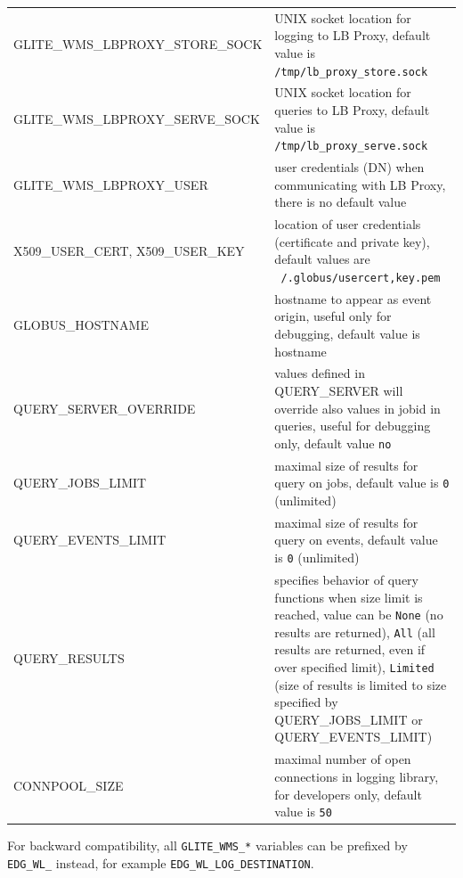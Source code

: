 \begin{tabularx}{\textwidth}{l>{\raggedright\arraybackslash}X}
GLITE\_WMS\_LBPROXY\_STORE\_SOCK &
   UNIX socket location for logging to LB Proxy,
   default value is \texttt{/tmp/lb\_proxy\_store.sock} \\
GLITE\_WMS\_LBPROXY\_SERVE\_SOCK &
   UNIX socket location for queries to LB Proxy,
   default value is \texttt{/tmp/lb\_proxy\_serve.sock} \\
GLITE\_WMS\_LBPROXY\_USER &
   user credentials (DN) when communicating with LB Proxy,  
   there is no default value \\
X509\_USER\_CERT, X509\_USER\_KEY & 
   location of user credentials (certificate and private key),
   default values are \texttt{~/.globus/user{cert,key}.pem} \\
GLOBUS\_HOSTNAME & 
   hostname to appear as event origin, useful only for debugging, 
   default value is hostname \\
QUERY\_SERVER\_OVERRIDE & 
   values defined in QUERY\_SERVER will override also values in jobid in queries,
   useful for debugging only, 
   default value \texttt{no} \\
QUERY\_JOBS\_LIMIT & 
   maximal size of results for query on jobs, 
   default value is  \texttt{0} (unlimited) \\
QUERY\_EVENTS\_LIMIT & 
   maximal size of results for query on events, 
   default value is  \texttt{0} (unlimited) \\
QUERY\_RESULTS & 
   specifies behavior of query functions when size limit is reached,
   value can be \texttt{None} (no results are returned),
   \texttt{All} (all results are returned, even if over specified limit),
   \texttt{Limited} (size of results is limited to size specified by QUERY\_JOBS\_LIMIT
   or QUERY\_EVENTS\_LIMIT) \\
CONNPOOL\_SIZE & 
   maximal number of open connections in logging library,
   for developers only,
   default value is \texttt{50} \\
\end{tabularx}

For backward compatibility, all \verb'GLITE_WMS_*' variables can be prefixed by
\verb'EDG_WL_' instead, for example \verb'EDG_WL_LOG_DESTINATION'.

